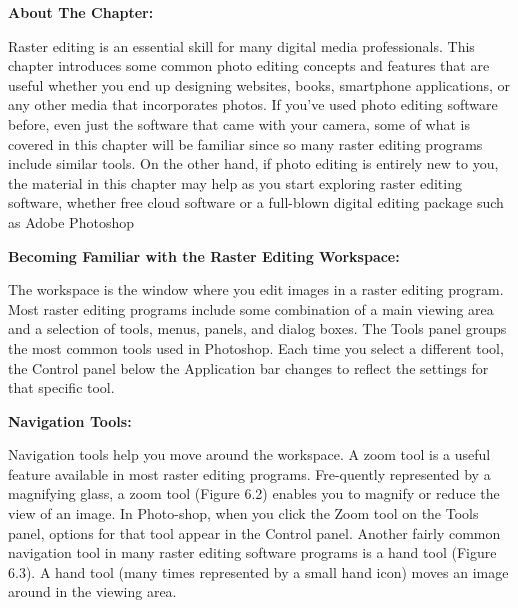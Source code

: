 \documentclass{report}
\begin{document}
   \pagebreak \bigbreak \noindent 
   \begin{Large}
       \textbf{About The Chapter:}
   \end{Large}
   \bigbreak \noindent
   Raster editing is an essential skill for many digital media professionals. This chapter introduces some common photo editing concepts and features that are useful whether you end up designing websites, books, smartphone applications, or any other media that incorporates photos. If you’ve used photo editing software before, even just the software that came with your camera, some of what is covered in this chapter will be familiar since so many raster editing programs include similar tools. On the other hand, if photo editing is entirely new to you, the material in this chapter may help as you start exploring raster editing software, whether free cloud software or a full-blown digital editing package such as Adobe Photoshop
    \bigbreak \noindent \bigbreak \bigbreak
    \begin{Large}
        \noindent \textbf{Becoming Familiar with the Raster Editing Workspace:}
    \end{Large}
    \bigbreak \noindent
    The workspace is the window where you edit images in a raster editing program. Most raster editing programs include some combination of a main viewing area and a selection of tools, menus, panels, and dialog boxes.
    \bigbreak \noindent
    The Tools panel groups the most common tools used in Photoshop. Each time you select a different tool, the Control panel below the Application bar changes to reflect the settings for that specific tool.

    \bigbreak \noindent \bigbreak \noindent
    \begin{Large}
        \textbf{Navigation Tools:}
    \end{Large}
    \bigbreak \noindent
    Navigation tools help you move around the workspace. A zoom tool is a useful feature available in most raster editing programs. Fre-quently represented by a magnifying glass, a zoom tool (Figure 6.2) enables you to magnify or reduce the view of an image. In Photo-shop, when you click the Zoom tool on the Tools panel, options for that tool appear in the Control panel.
    \bigbreak \noindent 
    Another fairly common navigation tool in many raster editing software programs is a hand tool (Figure 6.3). A hand tool (many times represented by a small hand icon) moves an image around in the viewing area.
\end{document}
